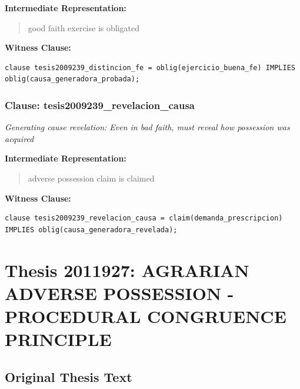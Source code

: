\documentclass[11pt,a4paper]{article}
\begin{document}
\textbf{Intermediate Representation:}

\begin{quote}
good faith exercise is obligated
\end{quote}

\textbf{Witness Clause:}

\begin{lstlisting}[style=witnessstyle, language=Witness]
clause tesis2009239_distincion_fe = oblig(ejercicio_buena_fe) IMPLIES oblig(causa_generadora_probada);
\end{lstlisting}

\subsubsection{Clause: tesis2009239\_revelacion\_causa}

\textit{Generating cause revelation: Even in bad faith, must reveal how possession was acquired}

\textbf{Intermediate Representation:}

\begin{quote}
adverse possession claim is claimed
\end{quote}

\textbf{Witness Clause:}

\begin{lstlisting}[style=witnessstyle, language=Witness]
clause tesis2009239_revelacion_causa = claim(demanda_prescripcion) IMPLIES oblig(causa_generadora_revelada);
\end{lstlisting}

\newpage

\section{Thesis 2011927: AGRARIAN ADVERSE POSSESSION - PROCEDURAL CONGRUENCE PRINCIPLE}
\label{thesis:2011927}

\subsection{Original Thesis Text}
\end{document}
